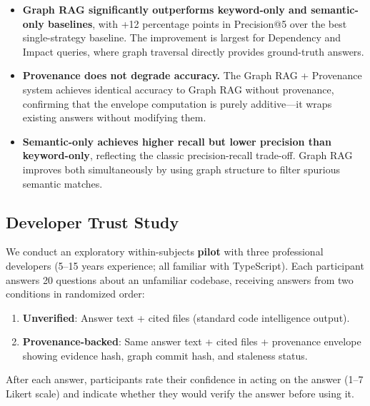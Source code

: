 \documentclass[conference]{IEEEtran}
\begin{document}
\begin{itemize}
  \item \textbf{Graph RAG significantly outperforms keyword-only and
    semantic-only baselines}, with +12 percentage points in Precision@5
    over the best single-strategy baseline. The improvement is largest
    for Dependency and Impact queries, where graph traversal directly
    provides ground-truth answers.

  \item \textbf{Provenance does not degrade accuracy.} The Graph RAG
    + Provenance system achieves identical accuracy to Graph RAG without
    provenance, confirming that the envelope computation is purely
    additive---it wraps existing answers without modifying them.

  \item \textbf{Semantic-only achieves higher recall but lower
    precision than keyword-only}, reflecting the classic precision-recall
    trade-off. Graph RAG improves both simultaneously by using graph
    structure to filter spurious semantic matches.
\end{itemize}

\subsection{Developer Trust Study}
\label{sec:eval:trust}

We conduct an exploratory within-subjects \textbf{pilot} with three professional
developers (5--15 years experience; all familiar with TypeScript). Each
participant answers 20 questions about an unfamiliar codebase, receiving
answers from two conditions in randomized order:

\begin{enumerate}
  \item \textbf{Unverified}: Answer text + cited files (standard code
    intelligence output).
  \item \textbf{Provenance-backed}: Same answer text + cited files +
    provenance envelope showing evidence hash, graph commit hash,
    and staleness status.
\end{enumerate}

After each answer, participants rate their confidence in acting on the
answer (1--7 Likert scale) and indicate whether they would verify the
answer before using it.
\end{document}
